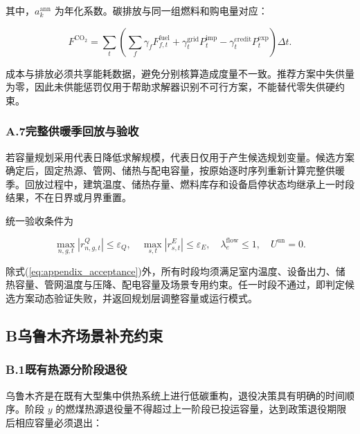 其中，$a_k^{\mathrm{ann}}$ 为年化系数。碳排放与同一组燃料和购电量对应：

\begin{equation}
F^{\mathrm{CO_2}}
=\sum_t\left(\sum_f\gamma_fF_{f,t}^{\mathrm{fuel}}+\gamma_t^{\mathrm{grid}}P_t^{\mathrm{imp}}
-\gamma_t^{\mathrm{credit}}P_t^{\mathrm{exp}}\right)\Delta t.
\label{eq:carbon_detail}
\end{equation}

成本与排放必须共享能耗数据，避免分别核算造成度量不一致。推荐方案中失供量为零，因此未供能惩罚仅用于帮助求解器识别不可行方案，不能替代零失供硬约束。

\subsubsection*{A.7\quad 完整供暖季回放与验收}

若容量规划采用代表日降低求解规模，代表日仅用于产生候选规划变量。候选方案确定后，固定热源、管网、储热与配电容量，按原始逐时序列重新计算完整供暖季。回放过程中，建筑温度、储热存量、燃料库存和设备启停状态均继承上一时段结果，不在日界或月界重置。

统一验收条件为

\begin{equation}
\max_{n,g,t}|r_{n,g,t}^{Q}|\leq\varepsilon_Q,
\quad
\max_{s,t}|r_{s,t}^{E}|\leq\varepsilon_E,
\quad
\lambda_e^{\mathrm{flow}}\leq1,
\quad
U^{\mathrm{un}}=0.
\label{eq:appendix_acceptance}
\end{equation}

除式(\ref{eq:appendix_acceptance})外，所有时段均须满足室内温度、设备出力、储热容量、管网温度与压降、配电容量及场景专用约束。任一时段不通过，即判定候选方案动态验证失败，并返回规划层调整容量或运行模式。

\clearpage

\subsection*{B\quad 乌鲁木齐场景补充约束}
\label{app:urumqi}

\subsubsection*{B.1\quad 既有热源分阶段退役}

乌鲁木齐是在既有大型集中供热系统上进行低碳重构，退役决策具有明确的时间顺序。阶段 $y$ 的燃煤热源退役量不得超过上一阶段已投运容量，达到政策退役期限后相应容量必须退出：

